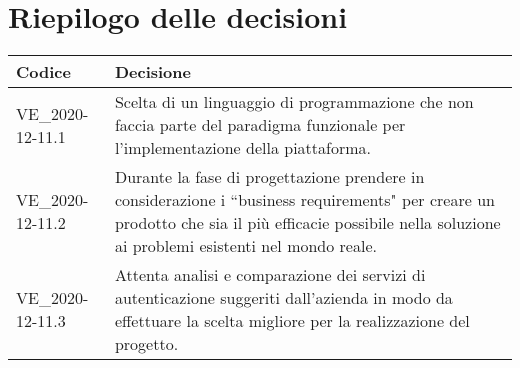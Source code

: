 \section{Riepilogo delle decisioni}
\setcounter{table}{-1}
{
\centering
\renewcommand{\arraystretch}{1.5}
\begin{longtable}{>{\centering}p{} >{}p{}}
\rowcolor{azzurro1}
\textbf{Codice} &
\centerline{\textbf{Decisione}}\\
\endhead

VE{\_}2020-12-11.1 & Scelta di un linguaggio di programmazione che non faccia parte del paradigma funzionale per l'implementazione della piattaforma.\\
VE{\_}2020-12-11.2 & Durante la fase di progettazione prendere in considerazione i ``business requirements" per creare un prodotto che sia il più efficacie possibile nella soluzione ai problemi esistenti nel mondo reale.\\
VE{\_}2020-12-11.3 & Attenta analisi e comparazione dei servizi di autenticazione suggeriti dall'azienda in modo da effettuare la scelta migliore per la realizzazione del progetto.\\
\end{longtable}
}